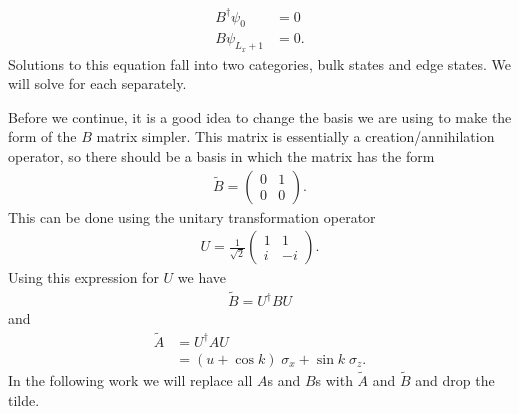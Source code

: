 \begin{align}
    B^\dag \psi_{0} &= 0\\
    B \psi_{L_x+1} &= 0.
\end{align}
Solutions to this equation fall into two categories, bulk states and edge states. We will solve for each separately.\par
Before we continue, it is a good idea to change the basis we are using to make the form of the $B$ matrix simpler. This matrix is essentially a creation/annihilation operator, so there should be a basis in which the matrix has the form
\begin{align}
    \tilde{B} = \begin{pmatrix}
    0 & 1 \\
    0 & 0 
     \end{pmatrix}.
\end{align}
This can be done using the unitary transformation operator
\begin{align}
    U = \frac{1}{\sqrt{2}}\begin{pmatrix}
    1 & 1 \\
    i & -i 
     \end{pmatrix}.
\end{align}
Using this expression for $U$ we have 
\begin{align}
    \tilde B  = U^\dag B U 
\end{align}
and 
\begin{align}
    \tilde A &= U^\dag A U \\
    &= (u + \cos k) \; \sigma_x + \sin k \; \sigma_z.
\end{align}
In the following work we will replace all $A$s and $B$s with $\tilde A$ and $\tilde B$ and drop the tilde. 


